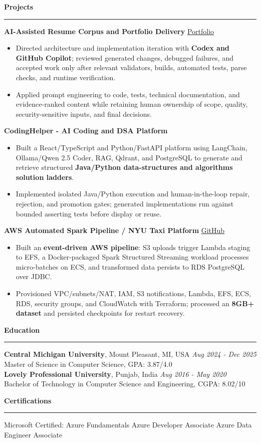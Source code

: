 \documentclass[11pt,letterpaper]{article}
\newcommand{\ressection}[1]{\Needspace{6\baselineskip}\vspace{8pt}\par\textbf{#1}\par\vspace{2pt}\hrule\vspace{5pt}}
\begin{document}
\ressection{Projects}
\textbf{AI-Assisted Resume Corpus and Portfolio Delivery} \hfill \href{https://github.com/preferablehuman/portfolio}{Portfolio}
\begin{itemize}
  \item Directed architecture and implementation iteration with \textbf{Codex and GitHub Copilot}; reviewed generated changes, debugged failures, and accepted work only after relevant validators, builds, automated tests, parse checks, and runtime verification.
  \item Applied prompt engineering to code, tests, technical documentation, and evidence-ranked content while retaining human ownership of scope, quality, security-sensitive inputs, and final decisions.
\end{itemize}
\vspace{2pt}
\textbf{CodingHelper - AI Coding and DSA Platform}
\begin{itemize}
  \item Built a React/TypeScript and Python/FastAPI platform using LangChain, Ollama/Qwen 2.5 Coder, RAG, Qdrant, and PostgreSQL to generate and retrieve structured \textbf{Java/Python data-structures and algorithms solution ladders}.
  \item Implemented isolated Java/Python execution and human-in-the-loop repair, rejection, and promotion gates; generated implementations run against bounded asserting tests before display or reuse.
\end{itemize}
\vspace{2pt}
\textbf{AWS Automated Spark Pipeline / NYU Taxi Platform} \hfill \href{https://github.com/preferablehuman/AWS-automated-spark-pipeline}{GitHub}
\begin{itemize}
  \item Built an \textbf{event-driven AWS pipeline}: S3 uploads trigger Lambda staging to EFS, a Docker-packaged Spark Structured Streaming workload processes micro-batches on ECS, and transformed data persists to RDS PostgreSQL over JDBC.
  \item Provisioned VPC/subnets/NAT, IAM, S3 notifications, Lambda, EFS, ECS, RDS, security groups, and CloudWatch with Terraform; processed an \textbf{8GB+ dataset} and persisted checkpoints for restart recovery.
\end{itemize}

\ressection{Education}
\textbf{Central Michigan University}, Mount Pleasant, MI, USA \hfill \textit{Aug 2024 - Dec 2025}\\
Master of Science in Computer Science, GPA: 3.87/4.0\\
\textbf{Lovely Professional University}, Punjab, India \hfill \textit{Aug 2016 - May 2020}\\
Bachelor of Technology in Computer Science and Engineering, CGPA: 8.02/10

\ressection{Certifications}
Microsoft Certified: Azure Fundamentals \textbar{} Azure Developer Associate \textbar{} Azure Data Engineer Associate
\end{document}
